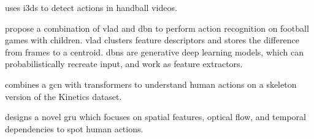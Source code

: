\textcite{host_handball_2023} uses \acrlong{i3d}s to detect actions in handball videos. 

\textcite{chen_children_2023} propose a combination of \acrfull{vlad} and \acrfull{dbn} to perform action recognition on football games with children. \acrshort{vlad} clusters feature descriptors and stores the difference from frames to a centroid\cite{jegou_vlad_2010}. \acrshort{dbn}s are generative deep learning models, which can probabilistically recreate input, and work as feature extractors\cite{hinton_dbn_2006}.

\textcite{wang_skeleton_two-stream_2023} combines a \acrfull{gcn} with transformers to understand human actions on a skeleton version of the Kinetics dataset.  

\textcite{giveki_human_2024} designs a novel \acrlong{gru} which focuses on spatial features, optical flow, and temporal dependencies to spot human actions. 